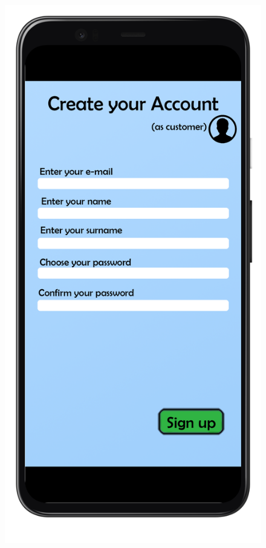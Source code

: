 \documentclass{article}
\begin{document}
		\begin{figure}[!h]
			\centering
			\begin{minipage}[!h]{0.4\textwidth}
				\includegraphics[width=\textwidth]{../Mockups/SignUpCustomer.png}

\end{minipage}
\end{figure}
\end{document}
